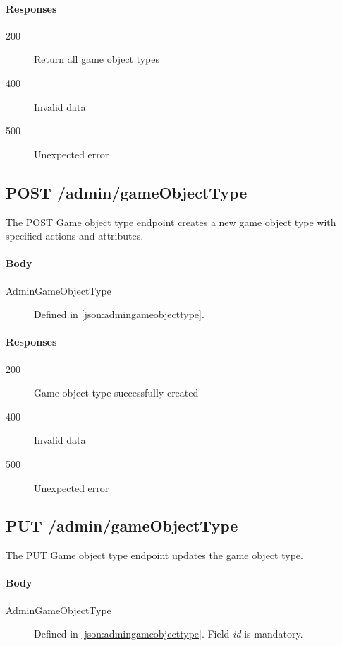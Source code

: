 		\paragraph*{Responses}
			\begin{description}		
				\item[200] Return all game object types
				\item[400] Invalid data
				\item[500] Unexpected error
			\end{description}
			
	\subsection{POST /admin/gameObjectType}
	The POST Game object type endpoint creates a new game object type with specified actions and attributes. 
		\paragraph*{Body}
			\begin{description}
				\item[AdminGameObjectType] Defined in \ref{json:admingameobjecttype}.
			\end{description}
		\paragraph*{Responses}
			\begin{description}		
				\item[200] Game object type successfully created
				\item[400] Invalid data
				\item[500] Unexpected error
			\end{description}
			
	\subsection{PUT /admin/gameObjectType}
	The PUT Game object type endpoint updates the game object type.
		\paragraph*{Body}
			\begin{description}
				\item[AdminGameObjectType] Defined in \ref{json:admingameobjecttype}. Field \textit{id} is mandatory.
			\end{description}
